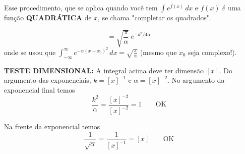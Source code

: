 Esse procedimento, que se aplica quando você tem $\int e^{f(x)}\,dx$ e $f(x)$ é uma função \textbf{QUADRÁTICA} de $x$, se chama "completar os quadrados".

\begin{equation}
    = \sqrt{\frac{\pi}{\alpha}}\; e^{-k^2/4\alpha}
\label{eq:aula12_fourier_gaussiana_2}
\end{equation}
onde se usou que $\displaystyle\int_{-\infty}^{\infty} e^{-\alpha(x+x_0)^2}\,dx = \sqrt{\frac{\pi}{\alpha}}$ (mesmo que $x_0$ seja complexo!).

\textbf{TESTE DIMENSIONAL:} A integral acima deve ter dimensão $[x]$. Do argumento das exponenciais, $k = [x]^{-1}$ e $\alpha = [x]^{-2}$. No argumento da exponencial final temos
\begin{equation}
    \frac{k^2}{\alpha} = \frac{[x]^{-2}}{[x]^{-2}} = 1 \qquad \text{OK}
\label{eq:aula12_teste_dimensional_1}
\end{equation}

Na frente da exponencial temos
\begin{equation}
    \frac{1}{\sqrt{\alpha}} = \frac{1}{[x]^{-1}} = [x] \qquad \text{OK}
\label{eq:aula12_teste_dimensional_2}
\end{equation}

